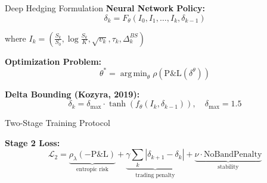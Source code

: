 \documentclass[aspectratio=169,11pt]{beamer}
\DeclareMathOperator*{\argmin}{arg\,min}
\begin{document}
\begin{frame}{Deep Hedging Formulation}
\textbf{Neural Network Policy:}
\begin{equation*}
\delta_k = F_\theta(I_0, I_1, \ldots, I_k, \delta_{k-1})
\end{equation*}

where $I_k = \left(\frac{S_k}{S_0}, \log\frac{S_k}{K}, \sqrt{v_k}, \tau_k, \Delta^{BS}_k\right)$

\vspace{0.5cm}
\textbf{Optimization Problem:}
\begin{equation*}
\theta^* = \argmin_\theta \rho\left(\text{P\&L}(\delta^\theta)\right)
\end{equation*}

\vspace{0.3cm}
\textbf{Delta Bounding (Kozyra, 2019):}
\begin{equation*}
\delta_k = \delta_{\max} \cdot \tanh(f_\theta(I_k, \delta_{k-1})), \quad \delta_{\max} = 1.5
\end{equation*}
\end{frame}

\begin{frame}{Two-Stage Training Protocol}
\begin{center}
\end{center}

\vspace{0.5cm}
\textbf{Stage 2 Loss:}
\begin{equation*}
\mathcal{L}_2 = \underbrace{\rho_\lambda(-\text{P\&L})}_{\text{entropic risk}} + \underbrace{\gamma \sum_k |\delta_{k+1} - \delta_k|}_{\text{trading penalty}} + \underbrace{\nu \cdot \text{NoBandPenalty}}_{\text{stability}}
\end{equation*}
\end{frame}
\end{document}
